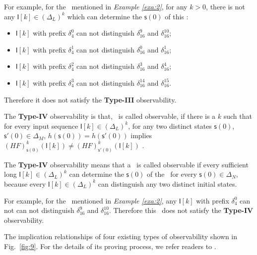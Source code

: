 \begin{example}
For example, for the \BCN\ mentioned in {\em Example \ref{exa:2}}, for any $k>0$, there is not any $\mathsf{I}[k]\in(\Delta_L)^k$ which can determine the $\mathsf{s}(0)$ of this \BCN:
\begin{itemize}
  \item $\mathsf{I}[k]$ with prefix $\delta_{4}^0$ can not distinguish $\delta_{16}^9$ and $\delta_{16}^{10}$;
  \item $\mathsf{I}[k]$ with prefix $\delta_{4}^1$ can not distinguish $\delta_{16}^0$ and $\delta_{16}^{1}$;
  \item $\mathsf{I}[k]$ with prefix $\delta_{4}^2$ can not distinguish $\delta_{16}^3$ and $\delta_{16}^{4}$;
  \item $\mathsf{I}[k]$ with prefix $\delta_{4}^3$ can not distinguish $\delta_{16}^{14}$ and $\delta_{16}^{15}$.
\end{itemize} 
Therefore it does not satisfy the {\bf Type-III} observability. 
\label{exa:6}
\end{example}  
\begin{definition}
	The {\bf Type-IV} observability is that, \BCN\ is called observable, if there is a $k$ such that for every input sequence $\mathsf{I}[k]\in(\Delta_L)^{k}$, for any two distinct states $\mathsf{s}(0)$, $\mathsf{s}'(0) \in \Delta_M$, $h(\mathsf{s}(0))=h(\mathsf{s}'(0))$ implies $(HF)^{k}_{\mathsf{s}(0)}(\mathsf{I}[k])\neq (HF)^{k}_{\mathsf{s}'(0)}(\mathsf{I}[k])$ \cite{Fornasini2013Observability}.
\end{definition}

The {\bf Type-IV} observability means that a \BCN\ is called observable if every sufficient long $\mathsf{I}[k]\in(\Delta_L)^{k}$ can determine the $\mathsf{s}(0)$ of the \BCN\ for every $\mathsf{s}(0)\in\Delta_N$, because every $\mathsf{I}[k]\in(\Delta_L)^{k}$ can distinguish any two distinct initial states.%
\begin{example}
For example, for the \BCN\ mentioned in {\em Example \ref{exa:2}}, any $\mathsf{I}[k]$ with prefix $\delta_{4}^0$ can not can not distinguish $\delta_{16}^9$ and $\delta_{16}^{10}$. 
Therefore this \BCN\ does not satisfy the {\bf Type-IV} observability. 
\label{exa:7}
\end{example}  

The implication relationships of four existing types of observability shown in Fig.~\ref{fig:9}. For the details of its proving process, we refer readers to \cite{Zhang2016Observability}.


